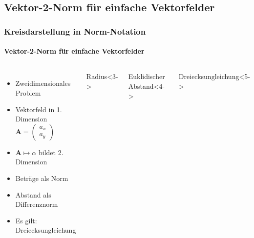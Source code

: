 \documentclass{beamer}
\begin{document}
\subsection{Vektor-2-Norm für einfache Vektorfelder}
\begin{frame}
\frametitle{Kreisdarstellung in Norm-Notation}
\framesubtitle{Vektor-2-Norm für einfache Vektorfelder}
\begin{columns}[c]
	\begin{itemize}
		\item<1-> Zweidimensionales Problem
		\item<2-> Vektorfeld in 1. Dimension $\mathbf{A} = \begin{pmatrix}a_x \\ a_y\end{pmatrix}$
		\item<2-> $\mathbf{A}\mapsto\alpha$ bildet 2. Dimension
		\item<3-> Beträge als Norm
		\item<4-> Abstand als Differenznorm
		\item<5-> Es gilt: Dreiecksungleichung
	\end{itemize}
	
	\begin{block}{Radius}<3->
	\end{block}
	\begin{block}{Euklidischer Abstand}<4->
	\end{block}
	\begin{block}{Dreiecksungleichung}<5->
	\end{block}
\end{columns}
\end{frame}
\end{document}

